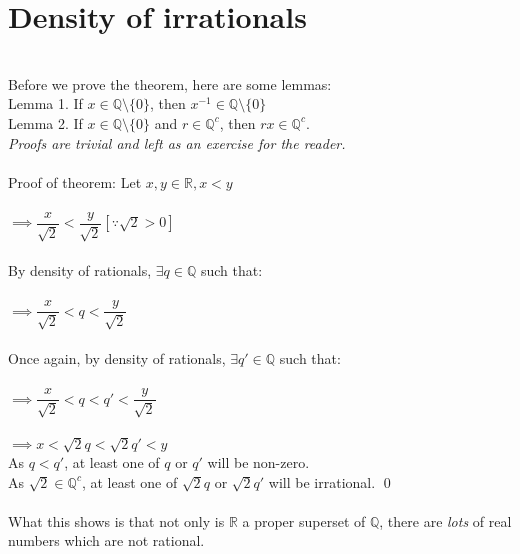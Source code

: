 \section{Density of irrationals}\label{sec:irratdense}
\\
Before we prove the theorem, here are some lemmas:\\
Lemma 1. If $x\in\mathbb{Q}\setminus\{0\}$, then $x^{-1}\in\mathbb{Q}\setminus\{0\}$\\
Lemma 2. If $x\in\mathbb{Q}\setminus\{0\}$ and $r\in\mathbb{Q}^c$, then $rx\in\mathbb{Q}^c$.\\
\textit{Proofs are trivial and left as an exercise for the reader.}\\~\\
Proof of theorem:
Let $x, y \in \mathbb{R}, x < y$\\~\\
$\implies \dfrac{x}{\sqrt{2}} < \dfrac{y}{\sqrt{2}}$\hfill$[\because\sqrt{2}>0]$\\~\\
By density of rationals, $\exists q\in\mathbb{Q}$ such that:\\~\\
$\implies \dfrac{x}{\sqrt{2}} < q < \dfrac{y}{\sqrt{2}}$\\~\\
Once again, by density of rationals, $\exists q'\in\mathbb{Q}$ such that:\\~\\
$\implies \dfrac{x}{\sqrt{2}} < q < q' < \dfrac{y}{\sqrt{2}}$\\~\\
$\implies x < \sqrt{2}q < \sqrt{2}q' < y$\\
As $q < q'$, at least one of $q$ or $q'$ will be non-zero.\\
As $\sqrt{2}\in\mathbb{Q}^c$, at least one of $\sqrt{2}q$ or $\sqrt{2}q'$ will be irrational. \hfill \qed\\~\\
What this shows is that not only is $\mathbb{R}$ a proper superset of $\mathbb{Q}$, there are \textit{lots} of real numbers which are not rational.
